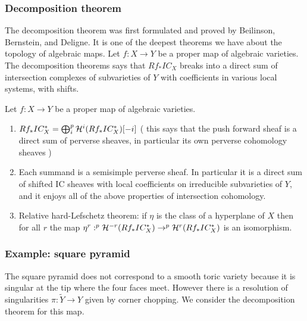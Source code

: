 \documentclass[12pt]{article}
\begin{document}
\subsubsection{Decomposition theorem}
The decomposition theorem was first formulated and proved by Beilinson, Bernstein, 
and Deligne. It is one of the deepest theorems we have about the topology of algebraic maps.
Let $f:X\to Y$ be a proper map of algebraic varieties. The decomposition theorems says that 
$Rf_*IC_X$ breaks into a direct sum of intersection complexes of subvarieties of $Y$
with coefficients in various local systems, with shifts.

\begin{theorem}
     Let $f:X\to Y$ be a proper map of algebraic varieties.
    \begin{enumerate}
        \item $Rf_*IC^*_X = \bigoplus_i ^p {\mathcal{H}}^i(Rf_*IC^*_X)[-i]$ (
            this says that the push forward sheaf is a direct sum of perverse sheaves,
            in particular its own perverse cohomology sheaves
        )
        \item Each summand is a semisimple perverse sheaf. In particular it is 
        a direct sum of shifted IC sheaves with local coefficients on irreducible
        subvarieties of $Y$, and it enjoys all of the above properties of intersection
        cohomology.
        \item Relative hard-Lefschetz theorem: if $\eta$ is the class of a hyperplane of 
        $X$ then for all $r$ the map $\eta^r:^p{\mathcal{H}}^{-r}(Rf_*IC^*_X) \to ^p{\mathcal{H}}^{r}(Rf_*IC^*_X)$
        is an isomorphism.
    \end{enumerate}
\end{theorem}

\subsubsection{Example: square pyramid}
The square pyramid does not correspond to a smooth toric variety because it is singular 
at the tip where the four faces meet. However there is a resolution of singularities
$\pi:\tilde Y\to Y$ given by corner chopping. We consider the decomposition theorem for this 
map. 

\hfill 
\end{document}
